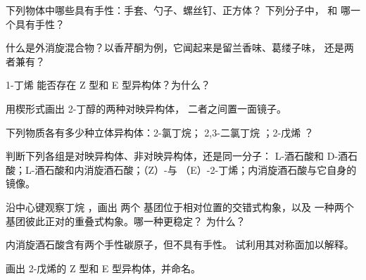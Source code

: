 \begin{exercise}[$\star$]\label{exo:g12:stereochemistry:3}
下列物体中哪些具有手性：手套、勺子、螺丝钉、正方体？
下列分子中， 和  哪一个具有手性？
\end{exercise}

\begin{exercise}[$\star$]\label{exo:g12:stereochemistry:4}
什么是外消旋混合物？以香芹酮为例，它闻起来是留兰香味、葛缕子味，
还是两者兼有？
\end{exercise}

\begin{exercise}[$\star$]\label{exo:g12:stereochemistry:5}
1-丁烯  能否存在 Z 型和 E 型异构体？为什么？
\end{exercise}

\begin{exercise}[$\star\star$]\label{exo:g12:stereochemistry:6}
用楔形式画出 2-丁醇的两种对映异构体，
二者之间置一面镜子。
\end{exercise}

\begin{exercise}[$\star\star$]\label{exo:g12:stereochemistry:7}
下列物质各有多少种立体异构体：2-氯丁烷；
2,3-二氯丁烷 ；2-戊烯
？
\end{exercise}

\begin{exercise}[$\star\star$]\label{exo:g12:stereochemistry:8}
判断下列各组是对映异构体、非对映异构体，还是同一分子：
L-酒石酸和 D-酒石酸；L-酒石酸和内消旋酒石酸；（Z）-与
（E）-2-丁烯；内消旋酒石酸与它自身的镜像。
\end{exercise}

\begin{exercise}[$\star\star$]\label{exo:g12:stereochemistry:9}
沿中心键观察丁烷 ，画出
两个  基团位于相对位置的交错式构象，以及
一种两个基团彼此正对的重叠式构象。哪一种更稳定？
为什么？
\end{exercise}

\begin{exercise}[$\star\star$]\label{exo:g12:stereochemistry:10}
内消旋酒石酸含有两个手性碳原子，但不具有手性。
试利用其对称面加以解释。
\end{exercise}

\begin{exercise}[$\star\star$]\label{exo:g12:stereochemistry:11}
画出 2-戊烯的 Z 型和 E 型异构体，并命名。
\end{exercise}

